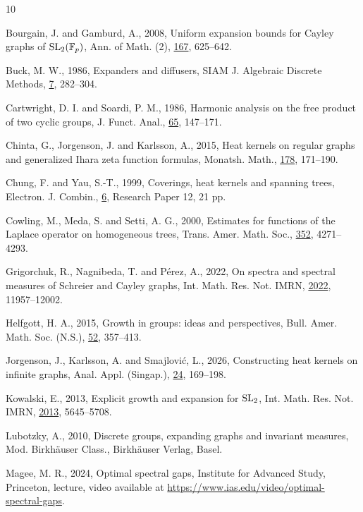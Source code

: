 \documentclass[11pt]{amsart}
\theoremstyle{definition}
\theoremstyle{remark}
\theoremstyle{plain}
\numberwithin{equation}{section}
\numberwithin{lemma}{section}
\numberwithin{definition}{section}
\numberwithin{proposition}{section}
\numberwithin{corollary}{section}
\numberwithin{theorem}{section}
\numberwithin{remark}{section}
\begin{document}
\begin{thebibliography}{10}

Bourgain, J. and Gamburd, A., 2008, Uniform expansion bounds for Cayley graphs of
\({\rm SL}_2(\mathbb F_p)\), Ann. of Math. (2), \underline{167}, 625--642.

Buck, M. W., 1986, Expanders and diffusers, SIAM J. Algebraic Discrete Methods,
\underline{7}, 282--304.

Cartwright, D. I. and Soardi, P. M., 1986, Harmonic analysis on the free product
of two cyclic groups, J. Funct. Anal., \underline{65}, 147--171.

Chinta, G., Jorgenson, J. and Karlsson, A., 2015, Heat kernels on regular graphs
and generalized Ihara zeta function formulas, Monatsh. Math., \underline{178},
171--190.

Chung, F. and Yau, S.-T., 1999, Coverings, heat kernels and spanning trees,
Electron. J. Combin., \underline{6}, Research Paper 12, 21 pp.

Cowling, M., Meda, S. and Setti, A. G., 2000, Estimates for functions of the
Laplace operator on homogeneous trees, Trans. Amer. Math. Soc., \underline{352},
4271--4293.

Grigorchuk, R., Nagnibeda, T. and P\'erez, A., 2022, On spectra and spectral
measures of Schreier and Cayley graphs, Int. Math. Res. Not. IMRN,
\underline{2022}, 11957--12002.

Helfgott, H. A., 2015, Growth in groups: ideas and perspectives, Bull. Amer.
Math. Soc. (N.S.), \underline{52}, 357--413.

Jorgenson, J., Karlsson, A. and Smajlovi\'c, L., 2026, Constructing heat kernels
on infinite graphs, Anal. Appl. (Singap.), \underline{24}, 169--198.

Kowalski, E., 2013, Explicit growth and expansion for \({\rm SL}_2\), Int. Math.
Res. Not. IMRN, \underline{2013}, 5645--5708.

Lubotzky, A., 2010, Discrete groups, expanding graphs and invariant measures,
Mod. Birkh\"auser Class., Birkh\"auser Verlag, Basel.

Magee, M. R., 2024, Optimal spectral gaps, Institute for Advanced Study,
Princeton, lecture, video available at
\url{https://www.ias.edu/video/optimal-spectral-gaps}.


\end{thebibliography}
\end{document}
